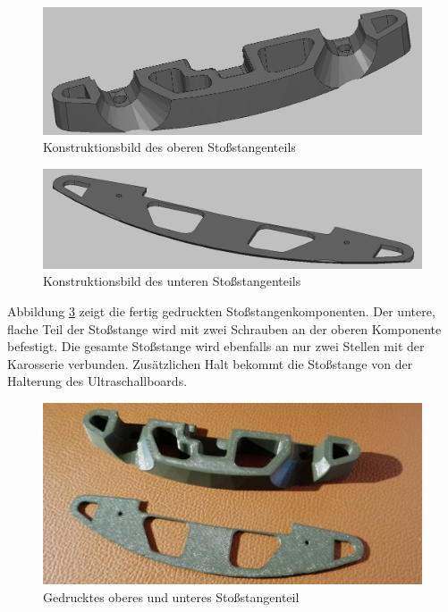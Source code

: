 \begin{figure}[H] %
\includegraphics[width=.8\textwidth]{sec2/images/3DAnbaukomponenten/Konstruktionsbilder/StossstangeKonstruktion01} 
\centering
\captionsetup{width=.95\textwidth}
\caption[Konstruktionsbild des oberen Stoßstangenteils]{Konstruktionsbild des oberen Stoßstangenteils}\centering
\label{fig:StossstangeKonstruktion01}
\end{figure}

\begin{figure}[H] %
\includegraphics[width=.8\textwidth]{sec2/images/3DAnbaukomponenten/Konstruktionsbilder/StossstangeKonstruktion02} 
\centering
\captionsetup{width=.95\textwidth}
\caption[Konstruktionsbild des unteren Stoßstangenteils]{Konstruktionsbild des unteren Stoßstangenteils}\centering
\label{fig:StossstangeKonstruktion02}
\end{figure}

Abbildung \ref{fig:StossstangeDruck} zeigt die fertig gedruckten Stoßstangenkomponenten. Der untere, flache Teil der Stoßstange wird mit zwei Schrauben an der oberen Komponente befestigt. Die gesamte Stoßstange wird ebenfalls an nur zwei Stellen mit der Karosserie verbunden. Zusätzlichen Halt bekommt die Stoßstange von der Halterung des Ultraschallboards.

\begin{figure}[H] %
\includegraphics[width=.7\textwidth]{sec2/images/3DAnbaukomponenten/Druckbilder/StossstangeDruck} 
\centering
\captionsetup{width=.95\textwidth}
\caption[Gedrucktes oberes und unteres Stoßstangenteil]{Gedrucktes oberes und unteres Stoßstangenteil}\centering
\label{fig:StossstangeDruck}
\end{figure}

